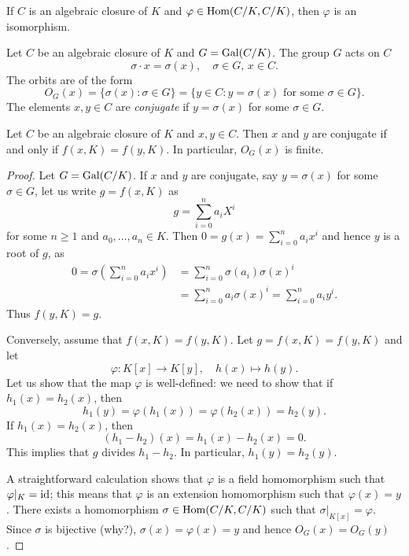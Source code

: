 \begin{exercise}
\label{xca:C/K_bijective}
If $C$ is an algebraic closure of $K$ and 
$\varphi\in\operatorname{Hom}(C/K,C/K)$, 
then $\varphi$ is an isomorphism. 
\end{exercise}


Let $C$ be an algebraic closure of $K$ and 
$G=\operatorname{Gal}(C/K)$. The group $G$ acts on $C$
\[
\sigma\cdot x=\sigma(x),\quad
\sigma\in G,\,x\in C.
\]
The orbits 
are of the form 
\[
O_G(x)=\{\sigma(x):\sigma\in G\}
=\{y\in C:y=\sigma(x)\text{ for some $\sigma\in G$}\}.
\]
The elements $x,y\in C$ are \emph{conjugate} 
if $y=\sigma(x)$ for some $\sigma\in G$. 

\begin{proposition}
\label{pro:conjugate}
    Let $C$ be an algebraic closure of $K$ and $x,y\in C$. Then 
    $x$ and $y$ are conjugate if and only if $f(x,K)=f(y,K)$. In particular, 
    $O_G(x)$ is finite. 
\end{proposition}

\begin{proof}
    Let $G=\operatorname{Gal}(C/K)$. 
    If $x$ and $y$ are conjugate, say $y=\sigma(x)$ for some $\sigma\in G$, 
    let us write $g=f(x,K)$ as 
    \[
    g=\sum_{i=0}^{n} a_iX^i
    \]
    for some $n\geq1$ and $a_0,\dots,a_{n}\in K$. 
    Then $0=g(x)=\sum_{i=0}^{n}a_ix^i$ and hence $y$ is
    a root of $g$, as 
    \begin{align*}
    0=\sigma\left(\sum_{i=0}^{n}a_ix^i\right)
    &=\sum_{i=0}^{n}\sigma(a_i)\sigma(x)^i\\
    &=\sum_{i=0}^{n}a_i\sigma(x)^i
    =\sum_{i=0}^{n}a_iy^i.
    \end{align*}
    Thus $f(y,K)=g$. 
    
    Conversely, assume that $f(x,K)=f(y,K)$. Let
    $g=f(x,K)=f(y,K)$ and let 
    \[
    \varphi\colon K[x]\to K[y],
    \quad
    h(x)\mapsto h(y).
    \]
    Let us show that the map $\varphi$ is well-defined: we need to show 
    that if 
    $h_1(x)=h_2(x)$, then 
    \[
    h_1(y)=\varphi(h_1(x))=\varphi(h_2(x))=h_2(y).
    \]
    If $h_1(x)=h_2(x)$, then 
    \[
    (h_1-h_2)(x)=h_1(x)-h_2(x)=0.
    \]
    This implies
    that $g$ divides $h_1-h_2$. In particular, $h_1(y)=h_2(y)$.
    
    A straightforward calculation shows that $\varphi$ is a field 
    homomorphism such that $\varphi|_K=\operatorname{id}$; this means that
    $\varphi$ is 
    an extension homomorphism such that $\varphi(x)=y$. There exists a homomorphism 
    $\sigma\in\operatorname{Hom}(C/K,C/K)$ such that 
    $\sigma|_{K[x]}=\varphi$. Since $\sigma$ is bijective 
    (why?), 
    $\sigma(x)=\varphi(x)=y$ and hence 
    $O_G(x)=O_G(y)$. 
\end{proof}

